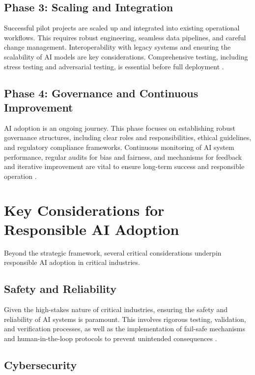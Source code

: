 \subsection{Phase 3: Scaling and Integration}

Successful pilot projects are scaled up and integrated into existing operational workflows. This requires robust engineering, seamless data pipelines, and careful change management. Interoperability with legacy systems and ensuring the scalability of AI models are key considerations. Comprehensive testing, including stress testing and adversarial testing, is essential before full deployment \parencite{dhs2024roles}.

\subsection{Phase 4: Governance and Continuous Improvement}

AI adoption is an ongoing journey. This phase focuses on establishing robust governance structures, including clear roles and responsibilities, ethical guidelines, and regulatory compliance frameworks. Continuous monitoring of AI system performance, regular audits for bias and fairness, and mechanisms for feedback and iterative improvement are vital to ensure long-term success and responsible operation \parencite{leyliabadi2025conceptual}.

\section{Key Considerations for Responsible AI Adoption}

Beyond the strategic framework, several critical considerations underpin responsible AI adoption in critical industries.

\subsection{Safety and Reliability}

Given the high-stakes nature of critical industries, ensuring the safety and reliability of AI systems is paramount. This involves rigorous testing, validation, and verification processes, as well as the implementation of fail-safe mechanisms and human-in-the-loop protocols to prevent unintended consequences \parencite{dhs2024roles}.

\subsection{Cybersecurity}

